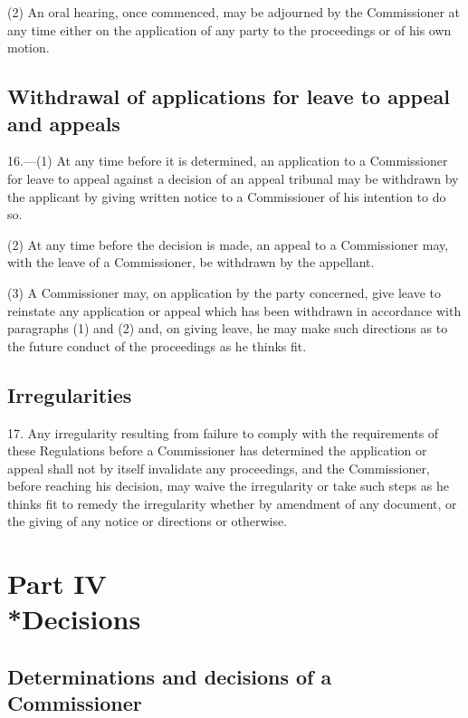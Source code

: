 \documentclass[12pt,a4paper]{article}
\begin{document}
(2) An oral hearing, once commenced, may be adjourned by the Commissioner at any time either on the application of any party to the proceedings or of his own motion.

\subsection[16. Withdrawal of applications for leave to appeal and appeals]{Withdrawal of applications for leave to appeal and appeals}

16.—(1) At any time before it is determined, an application to a Commissioner for leave to appeal against a decision of an appeal tribunal may be withdrawn by the applicant by giving written notice to a Commissioner of his intention to do so.

(2) At any time before the decision is made, an appeal to a Commissioner may, with the leave of a Commissioner, be withdrawn by the appellant.

(3) A Commissioner may, on application by the party concerned, give leave to reinstate any application or appeal which has been withdrawn in accordance with paragraphs (1) and (2) and, on giving leave, he may make such directions as to the future conduct of the proceedings as he thinks fit.

\subsection[17. Irregularities]{Irregularities}

17.  Any irregularity resulting from failure to comply with the requirements of these Regulations before a Commissioner has determined the application or appeal shall not by itself invalidate any proceedings, and the Commissioner, before reaching his decision, may waive the irregularity or take such steps as he thinks fit to remedy the irregularity whether by amendment of any document, or the giving of any notice or directions or otherwise.

\section[Part IV --- Decisions]{Part IV\\*Decisions}

\renewcommand\parthead{--- Part IV}

\subsection[18. Determinations and decisions of a Commissioner]{Determinations and decisions of a Commissioner}
\end{document}

